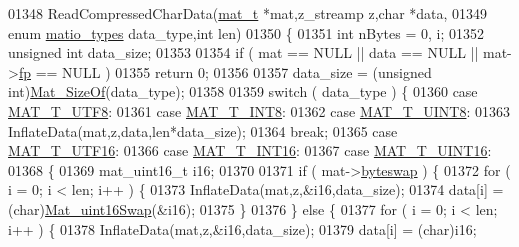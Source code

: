 \begin{DoxyCode}
01348 ReadCompressedCharData(\hyperlink{struct__mat__t}{mat\_t} *mat,z\_streamp z,\textcolor{keywordtype}{char} *data,
01349     \textcolor{keyword}{enum} \hyperlink{group___m_a_t_gacf7b3b879282b7ab3a51190e49bf3453}{matio\_types} data\_type,\textcolor{keywordtype}{int} len)
01350 \{
01351     \textcolor{keywordtype}{int} nBytes = 0, i;
01352     \textcolor{keywordtype}{unsigned} \textcolor{keywordtype}{int} data\_size;
01353 
01354     \textcolor{keywordflow}{if} ( mat == NULL || data == NULL || mat->\hyperlink{struct__mat__t_a85f562e407ca9ad4d2a6e14f839432b7}{fp} == NULL )
01355         \textcolor{keywordflow}{return} 0;
01356 
01357     data\_size = (\textcolor{keywordtype}{unsigned} int)\hyperlink{group__mat__util_gab6774aabdc124c540c1e7686d0804940}{Mat\_SizeOf}(data\_type);
01358 
01359     \textcolor{keywordflow}{switch} ( data\_type ) \{
01360         \textcolor{keywordflow}{case} \hyperlink{group___m_a_t_ggacf7b3b879282b7ab3a51190e49bf3453ac34ad81f5cbd3b7d0d95e57e5be0149b}{MAT\_T\_UTF8}:
01361         \textcolor{keywordflow}{case} \hyperlink{group___m_a_t_ggacf7b3b879282b7ab3a51190e49bf3453a9807f5033ed4f9b548953742d9fd1658}{MAT\_T\_INT8}:
01362         \textcolor{keywordflow}{case} \hyperlink{group___m_a_t_ggacf7b3b879282b7ab3a51190e49bf3453a01c1bd7db68f90552862eb5d311be408}{MAT\_T\_UINT8}:
01363             InflateData(mat,z,data,len*data\_size);
01364             \textcolor{keywordflow}{break};
01365         \textcolor{keywordflow}{case} \hyperlink{group___m_a_t_ggacf7b3b879282b7ab3a51190e49bf3453a87ffc0412143c326a1fcc759d5d81bdc}{MAT\_T\_UTF16}:
01366         \textcolor{keywordflow}{case} \hyperlink{group___m_a_t_ggacf7b3b879282b7ab3a51190e49bf3453a8c5b2e381946e95ea8d81ac216743302}{MAT\_T\_INT16}:
01367         \textcolor{keywordflow}{case} \hyperlink{group___m_a_t_ggacf7b3b879282b7ab3a51190e49bf3453a05bc7af7680aa68be95126ae0a4c2e31}{MAT\_T\_UINT16}:
01368         \{
01369             mat\_uint16\_t i16;
01370 
01371             \textcolor{keywordflow}{if} ( mat->\hyperlink{struct__mat__t_a99d207977af5e04941ace56d71817a40}{byteswap} ) \{
01372                 \textcolor{keywordflow}{for} ( i = 0; i < len; i++ ) \{
01373                     InflateData(mat,z,&i16,data\_size);
01374                     data[i] = (char)\hyperlink{endian_8c_a0fd527794c69f2872e80a6f20cd09fd2}{Mat\_uint16Swap}(&i16);
01375                 \}
01376             \} \textcolor{keywordflow}{else} \{
01377                 \textcolor{keywordflow}{for} ( i = 0; i < len; i++ ) \{
01378                     InflateData(mat,z,&i16,data\_size);
01379                     data[i] = (char)i16;

\end{DoxyCode}
